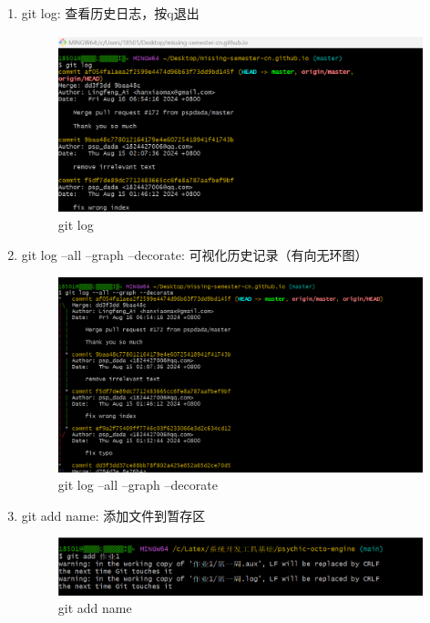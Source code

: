 \documentclass{ctexart}
\begin{document}
\begin{enumerate}
\vspace{-5pt}\item git log: 查看历史日志，按q退出
     \begin{figure}[H]
        \centering
        \includegraphics[width=18cm]{5.png}
        \caption{git log}
        \label{fig:14}
    \end{figure}

    \vspace{-5pt}\item git log --all --graph --decorate: 可视化历史记录（有向无环图）
    \begin{figure}[H]
       \centering
       \includegraphics[width=18cm]{6.png}
       \caption{git log --all --graph --decorate}
       \label{fig:15}
   \end{figure}

   \vspace{-5pt}\item git add name: 添加文件到暂存区
   \begin{figure}[H]
      \centering
      \includegraphics[width=18cm]{f5be76d6714babd5b02bc1ae4fcd7bdc.png}
      \caption{git add name}
      \label{fig:16}
  \end{figure}


\end{enumerate}
\end{document}

